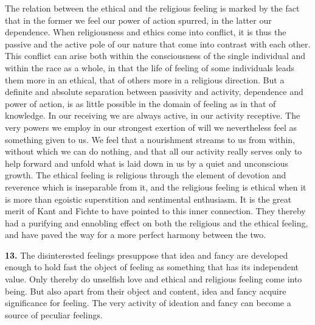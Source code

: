 \documentclass[12pt,a4paper]{book}
\newcommand{\opage}[1]{\marginnote{\footnotesize\textit{[#1]}}}
\begin{document}
The relation between the ethical and the religious feeling is marked by
the fact that in the former we feel our power of action spurred, in the
latter our dependence. When religiousness and ethics come into conflict,
it is thus the passive and the active pole of our nature that come into
contrast with each other. This conflict can arise both within the
consciousness of the single individual and within the race as a whole,
in that the life of feeling of some individuals leads them more in an
ethical, that of others more in a religious direction. But a definite
and absolute separation between passivity and activity, dependence and
power of action, is as little possible in the domain of feeling as in
that of knowledge. In our receiving we are always active, in our
activity receptive. The very powers we employ in our strongest exertion
of will we nevertheless feel as something given to us. We feel that a
nourishment streams to us from within, without which we can do nothing,
and that all our activity really serves only to help forward and unfold
\opage{314}what is laid down in us by a quiet and unconscious growth. The
ethical feeling is religious through the element of devotion and
reverence which is inseparable from it, and the religious feeling is
ethical when it is more than egoistic superstition and sentimental
enthusiasm. It is the great merit of Kant and Fichte to have pointed to
this inner connection. They thereby had a purifying and ennobling effect
on both the religious and the ethical feeling, and have paved the way
for a more perfect harmony between the two.

\textbf{13.} The disinterested feelings presuppose that idea and fancy
are developed enough to hold fast the object of feeling as something
that has its independent value. Only thereby do unselfish love and
ethical and religious feeling come into being. But also apart from their
object and content, idea and fancy acquire significance for feeling. The
very activity of ideation and fancy can become a source of peculiar
feelings.
\end{document}
